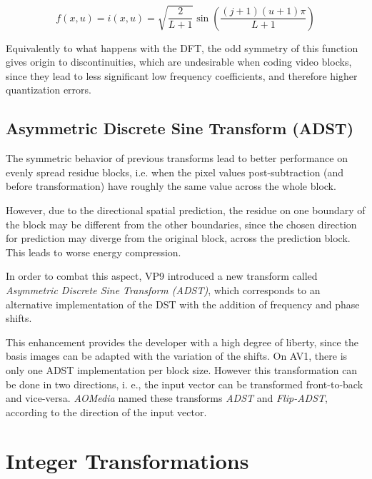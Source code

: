\begin{equation}
    f(x,u) = i(x,u) = \sqrt{\frac{2}{L+1}}\sin\left(\frac{(j+1)(u+1)\pi}{L+1}\right)
\end{equation}

Equivalently to what happens with the DFT, the odd symmetry of this function gives origin to discontinuities, which are undesirable when coding video blocks, since they lead to less significant low frequency coefficients, and therefore higher quantization errors.

\subsection{Asymmetric Discrete Sine Transform (ADST)}

\nocite{hanButterflyStructuredDesign2013}
\nocite{bingNextgenerationVideoCoding2015}

The symmetric behavior of previous transforms lead to better performance on evenly spread residue blocks, i.e. when the pixel values post-subtraction (and before transformation) have roughly the same value across the whole block.

However, due to the directional spatial prediction, the residue on one boundary of the block may be different from the other boundaries, since the chosen direction for prediction may diverge from the original block, across the prediction block. This leads to worse energy compression.

In order to combat this aspect, VP9 introduced a new transform called \emph{Asymmetric Discrete Sine Transform (ADST)}, which corresponds to an alternative implementation of the DST with the addition of frequency and phase shifts.

This enhancement provides the developer with a high degree of liberty, since the basis images can be adapted with the variation of the shifts. On AV1, there is only one ADST implementation per block size. However this transformation can be done in two directions, i. e., the input vector can be transformed front-to-back and vice-versa. \emph{AOMedia} named these transforms \emph{ADST} and \emph{Flip-ADST}, according to the direction of the input vector.


\section{Integer Transformations}
\nocite{soo-changpeiIntegerTransformsAnalogous2000}

